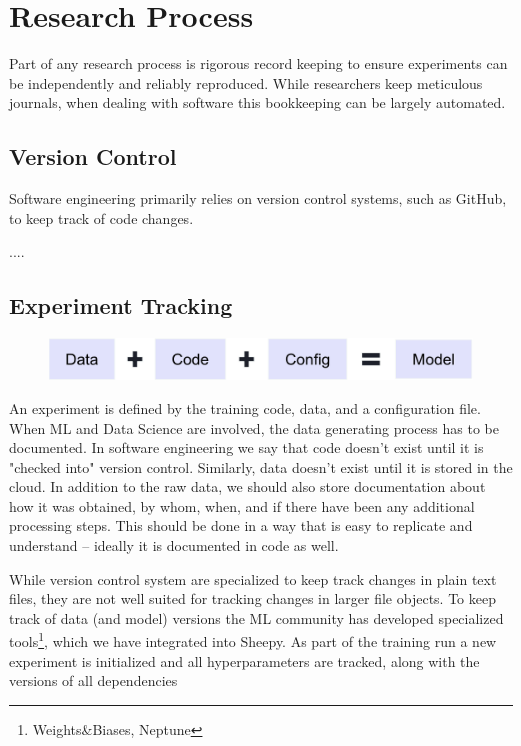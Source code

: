 
\section{Research Process}
Part of any research process is rigorous record keeping to ensure experiments can be independently and reliably reproduced.
While researchers keep meticulous journals, when dealing with software this bookkeeping can be largely automated.


\subsection{Version Control}
Software engineering primarily relies on version control systems, such as GitHub, to keep track of code changes.

....

\subsection{Experiment Tracking}
\begin{figure}[h]
    \includegraphics[width=\linewidth]{chapters/NLP/figures/model.png}
    \label{fig:model}
\end{figure}
An experiment is defined by the training code, data, and a configuration file.
When ML and Data Science are involved, the data generating process has to be documented.
In software engineering we say that code doesn't exist until it is "checked into" version control.
Similarly, data doesn't exist until it is stored in the cloud.
In addition to the raw data, we should also store documentation about how it was obtained, by whom, when, and if there have been any additional processing steps.
This should be done in a way that is easy to replicate and understand -- ideally it is documented in code as well.

While version control system are specialized to keep track changes in plain text files, they are not well suited for tracking changes in larger file objects.
To keep track of data (and model) versions the ML community has developed specialized tools\footnote{Weights\&Biases, Neptune}, which we have integrated into Sheepy.
As part of the training run a new experiment is initialized and all hyperparameters are tracked, along with the versions of all dependencies

